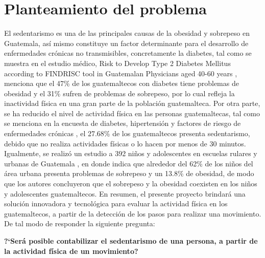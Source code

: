 \chapter{Planteamiento del problema}
El sedentarismo es una de las principales causas de la obesidad y sobrepeso en Guatemala, as\'i mismo constituye un factor determinante para el desarrollo de enfermedades cr\'onicas no transmisibles, concretamente la diabetes, tal como se muestra en el estudio m\'edico, Risk to Develop Type 2 Diabetes Mellitus according to FINDRISC tool in Guatemalan Physicians aged 40-60 years \cite{castro2017risk}, menciona que el 47\% de los guatemaltecos con diabetes tiene problemas de obesidad y el 31\%  sufren de problemas de sobrepeso, por lo cual refleja la inactividad f\'isica en una gran parte de la poblaci\'on guatemalteca.
\medbreak
Por otra parte, se ha reducido el nivel de actividad f\'isica en las personas guatemaltecas, tal como se menciona en la encuesta de diabetes, hipertensi\'on y factores de riesgo de enfermedades cr\'onicas \cite{orellana2006organizacion}, el 27.68\% de los guatemaltecos presenta sedentarismo, debido que no realiza actividades f\'isicas o lo hacen por menos de 30 minutos.
\medbreak
Igualmente, se realiz\'o un estudio a 392 ni\~nos y adolescentes en escuelas rulares y urbanas de Guatemala \cite{orellana2006organizacion}, en donde indica que alrededor del 62\% de los ni\~nos del  \'area urbana presenta problemas de sobrepeso y un 13.8\% de obesidad, de modo que los autores concluyeron que el sobrepeso y la obesidad coexisten en los ni\~nos y adolescentes guatemaltecos.
\medbreak
En resumen, el presente proyecto brindar\'a una soluci\'on innovadora y tecnol\'ogica para evaluar la actividad f\'isica en los guatemaltecos, a partir de la detecci\'on de los pasos para realizar una movimiento. De tal modo de responder la siguiente pregunta:
\medbreak
\begin{center}
\textbf{?`Ser\'a posible contabilizar el sedentarismo de una persona, a partir de la actividad f\'isica de un movimiento?}
\end{center}





